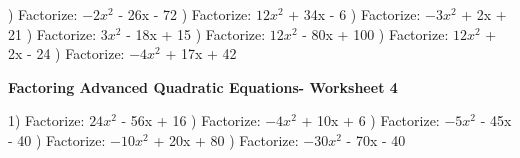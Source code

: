\documentclass{article}%
\begin{document}
\newline%
\newline%
) Factorize: $-2x^2$ - 26x - 72%
\newline%
\newline%
) Factorize: $12x^2$ + 34x - 6%
\newline%
\newline%
) Factorize: $-3x^2$ + 2x + 21%
\newline%
\newline%
) Factorize: $3x^2$ - 18x + 15%
\newline%
\newline%
) Factorize: $12x^2$ - 80x + 100%
\newline%
\newline%
) Factorize: $12x^2$ + 2x - 24%
\newline%
\newline%
) Factorize: $-4x^2$ + 17x + 42%
\newline%
\newline%
\newline%
\pagebreak%
\large%
\begin{center}%
\textbf{Factoring Advanced Quadratic Equations- Worksheet 4}%
\newline%
\newline%
\newline%
\end{center} \normalsize%
1) Factorize: $24x^2$ - 56x + 16%
\newline%
\newline%
) Factorize: $-4x^2$ + 10x + 6%
\newline%
\newline%
) Factorize: $-5x^2$ - 45x - 40%
\newline%
\newline%
) Factorize: $-10x^2$ + 20x + 80%
\newline%
\newline%
) Factorize: $-30x^2$ - 70x - 40%
\newline%
\end{document}
